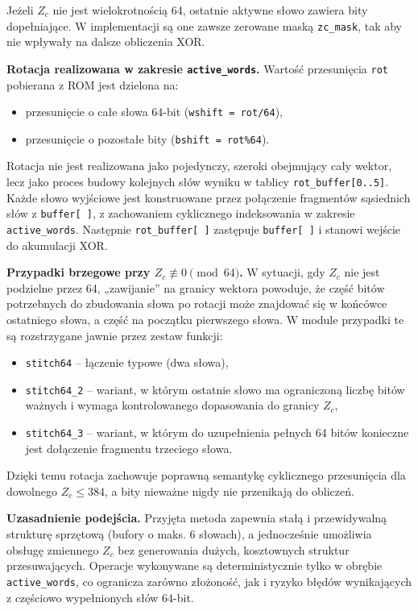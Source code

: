 Jeżeli $Z_c$ nie jest wielokrotnością 64, ostatnie aktywne słowo zawiera bity dopełniające.
W implementacji są one zawsze zerowane maską \texttt{zc\_mask}, tak aby nie wpływały na dalsze obliczenia XOR.

\medskip
\noindent\textbf{Rotacja realizowana w zakresie \texttt{active\_words}.}
Wartość przesunięcia \texttt{rot} pobierana z ROM jest dzielona na:
\begin{itemize}
  \item przesunięcie o całe słowa 64-bit (\texttt{wshift = rot/64}),
  \item przesunięcie o pozostałe bity (\texttt{bshift = rot\%64}).
\end{itemize}
Rotacja nie jest realizowana jako pojedynczy, szeroki  obejmujący cały wektor,
lecz jako proces budowy kolejnych słów wyniku w tablicy \texttt{rot\_buffer[0..5]}.
Każde słowo wyjściowe jest konstruowane przez połączenie fragmentów sąsiednich słów z \texttt{buffer[ ]},
z zachowaniem cyklicznego indeksowania w zakresie \texttt{active\_words}. Następnie \texttt{rot\_buffer[ ]}
zastępuje \texttt{buffer[ ]} i stanowi wejście do akumulacji XOR.

\medskip
\noindent\textbf{Przypadki brzegowe przy $Z_c \not\equiv 0 \pmod{64}$.}
W sytuacji, gdy $Z_c$ nie jest podzielne przez 64, „zawijanie” na granicy wektora powoduje,
że część bitów potrzebnych do zbudowania słowa po rotacji może znajdować się w końcówce ostatniego słowa,
a część na początku pierwszego słowa. W module przypadki te są rozstrzygane jawnie przez zestaw funkcji:
\begin{itemize}
  \item \texttt{stitch64} -- łączenie typowe (dwa słowa),
  \item \texttt{stitch64\_2} -- wariant, w którym ostatnie słowo ma ograniczoną liczbę bitów ważnych
        i wymaga kontrolowanego dopasowania do granicy $Z_c$,
  \item \texttt{stitch64\_3} -- wariant, w którym do uzupełnienia pełnych 64 bitów konieczne jest
        dołączenie fragmentu trzeciego słowa.
\end{itemize}
Dzięki temu rotacja zachowuje poprawną semantykę cyklicznego przesunięcia dla dowolnego $Z_c \le 384$,
a bity nieważne nigdy nie przenikają do obliczeń.

\medskip
\noindent\textbf{Uzasadnienie podejścia.}
Przyjęta metoda zapewnia stałą i przewidywalną strukturę sprzętową (bufory o maks. 6 słowach),
a jednocześnie umożliwia obsługę zmiennego $Z_c$ bez generowania dużych, kosztownych struktur przesuwających.
Operacje wykonywane są deterministycznie tylko w obrębie \texttt{active\_words}, co ogranicza zarówno złożoność,
jak i ryzyko błędów wynikających z częściowo wypełnionych słów 64-bit.




